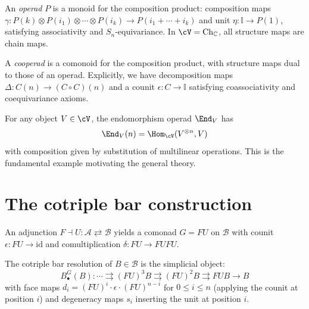 \begin{definition}[Operad]
An \emph{operad} $P$ is a monoid for the composition product: composition maps $\gamma : P(k) \otimes P(i_1) \otimes \cdots \otimes P(i_k) \to P(i_1 + \cdots + i_k)$ and unit $\eta : \mathbb{I} \to P(1)$, satisfying associativity and $S_n$-equivariance. In $\cV = \mathrm{Ch}_\mathbb{C}$, all structure maps are chain maps.
\end{definition}

\begin{definition}[Cooperad]
A \emph{cooperad} is a comonoid for the composition product, with structure maps dual to those of an operad. Explicitly, we have decomposition maps $\Delta : C(n) \to (C \circ C)(n)$ and a counit $\epsilon : C \to \mathbb{I}$ satisfying coassociativity and coequivariance axioms.
\end{definition}

\begin{example}
For any object $V \in \cV$, the endomorphism operad $\End_V$ has
\[
\End_V(n) = \Hom_\cV(V^{\otimes n}, V)
\]
with composition given by substitution of multilinear operations. This is the fundamental example motivating the general theory.
\end{example}

\section{The cotriple bar construction}

An adjunction $F \dashv U \colon \mathcal{A} \rightleftarrows
\mathcal{B}$ yields a comonad $G = FU$ on $\mathcal{B}$ with
counit $\epsilon\colon FU \to \mathrm{id}$ and comultiplication
$\delta\colon FU \to FUFU$.

\begin{definition}
The cotriple bar resolution of $B \in \mathcal{B}$ is the simplicial object:
\[
B^G_\bullet(B) : \cdots \rightrightarrows (FU)^3B \rightrightarrows (FU)^2B \rightrightarrows FUB \to B
\]
with face maps $d_i = (FU)^{i} \cdot \epsilon \cdot (FU)^{n-i}$ for $0 \le i \le n$ (applying the counit at position $i$) and degeneracy maps $s_i$ inserting the unit at position $i$.
\end{definition}


